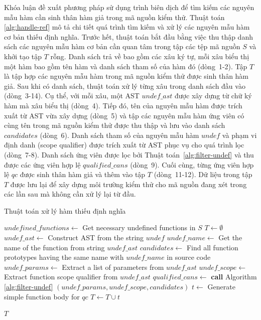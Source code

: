 Khóa luận đề xuất phương pháp sử dụng trình biên dịch để tìm kiếm các nguyên mẫu hàm cần sinh thân hàm giả trong mã nguồn kiểm thử. Thuật toán \autoref{alg:handle-ref} mô tả chi tiết quá trình tìm kiếm và xử lý các nguyên mẫu hàm cơ bản thiếu định nghĩa. Trước hết, thuật toán bắt đầu bằng việc thu thập danh sách các nguyên mẫu hàm cơ bản cần quan tâm trong tập các tệp mã nguồn $S$ và khởi tạo tập $T$ rỗng. Danh sách trả về bao gồm các xâu ký tự, mỗi xâu biểu thị một hàm bao gồm tên hàm và danh sách tham số của hàm đó (dòng~1-2). Tập $T$ là tập hợp các nguyên mẫu hàm trong mã nguồn kiểm thử được sinh thân hàm giả. Sau khi có danh sách, thuật toán xử lý từng xâu trong danh sách đầu vào (dòng~3-14). Cụ thể, với mỗi xâu, một AST $undef\_ast$ được xây dựng từ chữ ký hàm mà xâu biểu thị (dòng~4). Tiếp đó, tên của nguyên mẫu hàm được trích xuất từ AST vừa xây dựng (dòng~5) và tập các nguyên mẫu hàm ứng viên có cùng tên trong mã nguồn kiểm thử được thu thập và lưu vào danh sách $candidates$ (dòng~6). Danh sách tham số của nguyên mẫu hàm $undef$ và phạm vi định danh (scope qualifier) được trích xuất từ AST phục vụ cho quá trình lọc (dòng~7-8). Danh sách ứng viên được lọc bởi Thuật toán~\ref{alg:filter-undef} và thu được các ứng viên hợp lệ $qualified\_cans$ (dòng~9). Cuối cùng, từng ứng viên hợp lệ $qc$ được sinh thân hàm giả và thêm vào tập $T$ (dòng~11-12). Dữ liệu trong tập $T$ được lưu lại để xây dựng môi trường kiểm thử cho mã nguồn đang xét trong các lần sau mà không cần xử lý lại từ đầu.

\begin{algorithm}[ht]
    \small
    \caption{Thuật toán xử lý hàm thiếu định nghĩa}
    \label{alg:handle-ref}
					
    $undefined\_functions \leftarrow $ Get necessary undefined functions in $S$\;
    $T \leftarrow \emptyset$\;
     {
        $undef\_ast\leftarrow$ Construct AST from the string $undef$\;
        $undef\_name \leftarrow$ Get the name of the function from string $undef\_ast$\;
        $candidates \leftarrow$ Find all function prototypes having the same name with $undef\_name$ in source code\;
        $undef\_params \leftarrow$ Extract a list of parameters from $undef\_ast$\;
        $undef\_scope\leftarrow$ Extract function scope qualifier from $undef\_ast$\;
        $qualified\_cans\leftarrow$ \textbf{call} Algorithm \autoref{alg:filter-undef} $(undef\_params, undef\_scope, candidates)$\;
         {
            $t \leftarrow $ Generate simple function body for $qc$\;
            $T \leftarrow T \cup {t}$
        }
    }

    \Return $T$
\end{algorithm}

